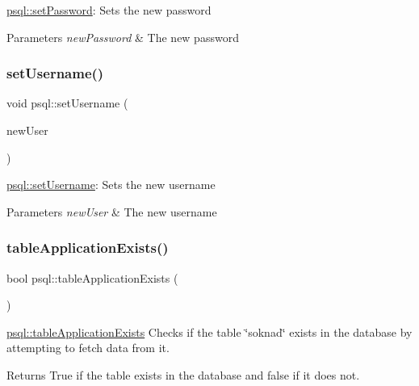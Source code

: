 \hyperlink{classpsql_a6c29350037550b7e5a5bb8f439c405f3}{psql\+::set\+Password}\+: Sets the new password 


\begin{DoxyParams}{Parameters}
{\em new\+Password} & The new password \\
\hline
\end{DoxyParams}
\mbox{\label{classpsql_a1488a9e4909abd172651b7be240342cb}} 
\subsubsection{\texorpdfstring{set\+Username()}{setUsername()}}
{\footnotesize\ttfamily void psql\+::set\+Username (\begin{DoxyParamCaption}\item[{Q\+String}]{new\+User }\end{DoxyParamCaption})}



\hyperlink{classpsql_a1488a9e4909abd172651b7be240342cb}{psql\+::set\+Username}\+: Sets the new username 


\begin{DoxyParams}{Parameters}
{\em new\+User} & The new username \\
\hline
\end{DoxyParams}
\mbox{\label{classpsql_a117b616053845f1b7295b21a06f008fd}} 
\subsubsection{\texorpdfstring{table\+Application\+Exists()}{tableApplicationExists()}}
{\footnotesize\ttfamily bool psql\+::table\+Application\+Exists (\begin{DoxyParamCaption}{ }\end{DoxyParamCaption})}



\hyperlink{classpsql_a117b616053845f1b7295b21a06f008fd}{psql\+::table\+Application\+Exists} Checks if the table \char`\"{}soknad\char`\"{} exists in the database by attempting to fetch data from it. 

\begin{DoxyReturn}{Returns}
True if the table exists in the database and false if it does not. 
\end{DoxyReturn}
\mbox{\label{classpsql_ae0ab0012c58471bd3fd63c286fb22224}} 
